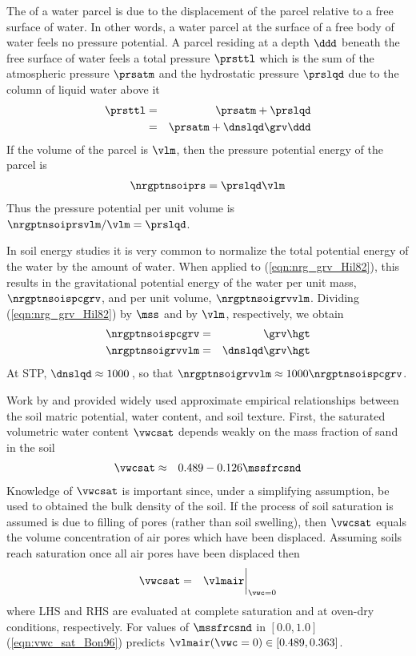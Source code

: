 \documentclass[12pt,twoside]{book}
\begin{document}
The  of a water parcel is due to the
displacement of the parcel relative to a free surface of water.
In other words, a water parcel at the surface of a free body of water
feels no pressure potential.
A parcel residing at a depth $\ddd$ beneath the free surface of water 
feels a total pressure $\prsttl$ which is the sum of the atmospheric
pressure $\prsatm$ and the hydrostatic pressure $\prslqd$ due to the
column of liquid water above it
\begin{eqnarray}
\prsttl & = & \prsatm + \prslqd \nonumber \\
& = & \prsatm + \dnslqd \grv \ddd
\label{eqn:prs_prc}
\end{eqnarray}
If the volume of the parcel is $\vlm$, then the pressure potential
energy of the parcel is 
\begin{eqnarray}
\nrgptnsoiprs = \prslqd \vlm
\label{eqn:nrg_ptn_prs_dfn}
\end{eqnarray}
Thus the pressure potential per unit volume is 
$\nrgptnsoiprsvlm / \vlm = \prslqd$.

In soil energy studies it is very common to normalize the total
potential energy of the water by the amount of water.
When applied to (\ref{eqn:nrg_grv_Hil82}), this results in the
gravitational potential energy of the water per unit mass,
$\nrgptnsoispcgrv$, and per unit volume, $\nrgptnsoigrvvlm$.
Dividing (\ref{eqn:nrg_grv_Hil82}) by $\mss$ and by $\vlm$,
respectively, we obtain
\begin{eqnarray}
\label{eqn:nrg_ptn_grv_mss_dfn}
\nrgptnsoispcgrv & = & \grv \hgt \\
\label{eqn:nrg_ptn_grv_vlm_dfn}
\nrgptnsoigrvvlm & = & \dnslqd \grv \hgt
\end{eqnarray}
At STP, $\dnslqd \approx 1000$\,\kgxmC, so that 
$\nrgptnsoigrvvlm \approx 1000 \nrgptnsoispcgrv$.

Work by \cite{ClH78} and \cite{CHC84} provided widely used approximate
empirical relationships between the soil matric potential, water
content, and soil texture.
First, the saturated volumetric water content $\vwcsat$ depends weakly
on the mass fraction of sand in the soil  
\begin{eqnarray}
\vwcsat & \approx & 0.489 - 0.126 \mssfrcsnd
\label{eqn:vwc_sat_Bon96}
\end{eqnarray}
Knowledge of $\vwcsat$ is important since, under a simplifying
assumption, be used to obtained the bulk density of the soil.
If the process of soil saturation is assumed is due to filling of
pores (rather than soil swelling), then $\vwcsat$ equals the volume
concentration of air pores which have been displaced.
Assuming soils reach saturation once all air pores have been displaced  
then 
\begin{eqnarray}
\vwcsat & = & \vlmair \bigg|_{\vwc = 0}
\label{eqn:vwc_sat_air}
\end{eqnarray}
where LHS and RHS are evaluated at complete saturation and at oven-dry 
conditions, respectively.
For values of $\mssfrcsnd$ in $[0.0,1.0]$ (\ref{eqn:vwc_sat_Bon96})
predicts $\vlmair(\vwc = 0) \in [0.489,0.363]$.
\end{document}
